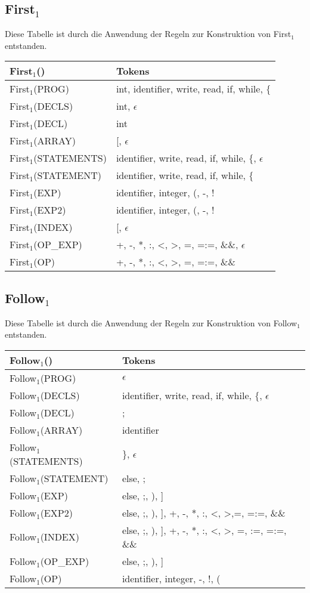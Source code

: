 \documentclass[
a4paper,   %
11pt,      %
oneside,   %
onecolumn, %
final      %
]{article}
\begin{document}
\subsection{First$_1$}
Diese Tabelle ist durch die Anwendung der Regeln zur Konstruktion von First$_1$ entstanden.
\newline
\begin{tabular}{| l | l |}
	\hline
		First$_1$() & Tokens \\
		\hline
		First$_1$(PROG) & int, identifier, write, read, if, while, $\{$ \\
		First$_1$(DECLS) & int, $\epsilon$ \\
		First$_1$(DECL) & int \\
		First$_1$(ARRAY) & [, $\epsilon$ \\
		First$_1$(STATEMENTS) & identifier, write, read, if, while, $\{$, $\epsilon$ \\
		First$_1$(STATEMENT) & identifier, write, read, if, while, $\{$ \\
		First$_1$(EXP) & identifier, integer, (, -, ! \\
		First$_1$(EXP2) & identifier, integer, (, -, ! \\
		First$_1$(INDEX) & [, $\epsilon$ \\
		First$_1$(OP\_EXP) & +, -, *, :, <, >, =, =:=, \&\&, $\epsilon$ \\
		First$_1$(OP) & +, -, *, :, <, >, =, =:=, \&\& \\
	\hline
\end{tabular}
\newline

\subsection{Follow$_1$}
Diese Tabelle ist durch die Anwendung der Regeln zur Konstruktion von Follow$_1$ entstanden.
\newline
\begin{tabular}{| l | l |}
	\hline
		Follow$_1$() & Tokens \\
		\hline
		Follow$_1$(PROG) & $\epsilon$ \\
		Follow$_1$(DECLS) & identifier, write, read, if, while, $\{$, $\epsilon$ \\
		Follow$_1$(DECL) & ; \\
		Follow$_1$(ARRAY) & identifier \\
		Follow$_1$(STATEMENTS) & $\}$, $\epsilon$ \\
		Follow$_1$(STATEMENT) & else, ; \\
		Follow$_1$(EXP) & else, ;, ), ] \\
		Follow$_1$(EXP2) & else, ;, ), ], +, -, *, :, <, >,=, =:=, \&\& \\
		Follow$_1$(INDEX) & else, ;, ), ], +, -, *, :, <, >, =, :=, =:=, \&\& \\
		Follow$_1$(OP\_EXP) & else, ;, ), ] \\
		Follow$_1$(OP) & identifier, integer, -, !, ( \\
	\hline
\end{tabular}
\newpage
\end{document}
